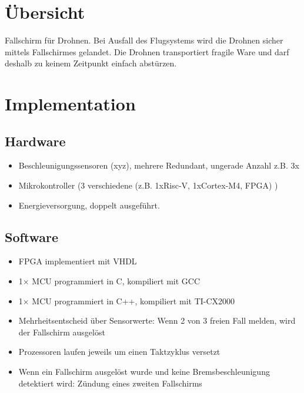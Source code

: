 

\section{Übersicht}

Fallschirm für Drohnen. Bei Ausfall des Flugsystems wird die Drohnen sicher mittels Fallschirmes gelandet. Die Drohnen transportiert fragile Ware und darf deshalb zu keinem Zeitpunkt einfach abstürzen.

\section{Implementation}

\subsection{Hardware}

\begin{itemize}
	\item Beschleunigungssensoren (xyz), mehrere Redundant, ungerade Anzahl z.B. 3x
	\item Mikrokontroller (3 verschiedene (z.B. 1xRisc-V, 1xCortex-M4, FPGA) )
	\item Energieversorgung, doppelt ausgeführt.
\end{itemize}

\subsection{Software}
\begin{itemize}
	\item FPGA implementiert mit VHDL
	\item 1× MCU programmiert in C, kompiliert mit GCC
	\item 1× MCU programmiert in C++, kompiliert mit TI-CX2000
	\item Mehrheitsentscheid über Sensorwerte: Wenn 2 von 3 freien Fall melden, wird der Fallschirm ausgelöst
	\item Prozessoren laufen jeweils um einen Taktzyklus versetzt
	\item Wenn ein Fallschirm ausgelöst wurde und keine Bremsbeschleunigung detektiert wird: Zündung eines zweiten Fallschirms
\end{itemize}

